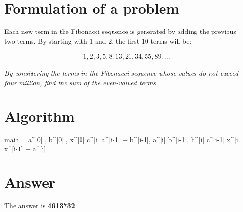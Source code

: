 \documentclass[12pt]{article}
\begin{document}
\maketitle

\section{Formulation of a problem}
Each new term in the Fibonacci sequence is generated by adding the previous two terms. By starting with 1 and 2, the first 10 terms will be:

\begin{align*}
1, 2, 3, 5, 8, 13, 21, 34, 55, 89, ...
\end{align*}

\emph{By considering the terms in the Fibonacci sequence whose values do not
exceed four million, find the sum of the even-valued terms.}

\section{Algorithm}
\begin{eqcode}{main}{\ }{\ }{}
  a^{[0]} ,
  b^{[0]} ,
  x^{[0]}  \lend
  c^{[i]} \gets a^{[i-1]} + b^{[i-1]},
  a^{[i]} \gets b^{[i-1]},
  b^{[i]} \gets c^{[i-1]} \lend
    x^{[i]} \gets x^{[i-1]} + a^{[i]} \lend
  \qendif
   \lend

\end{eqcode}

\section{Answer}
  The answer is \bf{4613732}
\end{document}
